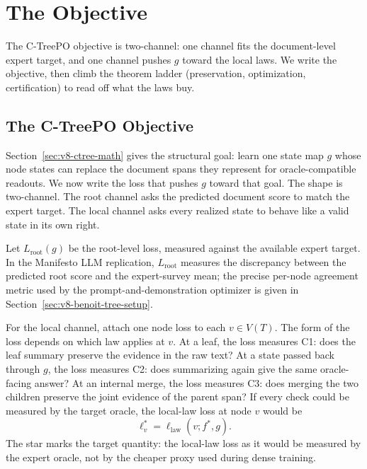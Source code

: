 \section{The Objective}
\label{sec:v8-objective}
\label{sec:v8-theorem-ladder}

The C-TreePO objective is two-channel: one channel fits the
document-level expert target, and one channel pushes \(g\) toward
the local laws. We write the objective, then climb the theorem
ladder (preservation, optimization, certification) to read off what
the laws buy.

\subsection{The C-TreePO Objective}

Section~\ref{sec:v8-ctree-math} gives the structural goal: learn
one state map \(g\) whose node states can replace the document
spans they represent for oracle-compatible readouts. We now write
the loss that pushes \(g\) toward that goal. The shape is
two-channel. The root channel asks the predicted document score to
match the expert target. The local channel asks every realized state
to behave like a valid state in its own right.

Let \(L_{\mathrm{root}}(g)\) be the root-level loss, measured
against the available expert target. In the Manifesto LLM
replication, \(L_{\mathrm{root}}\) measures the discrepancy between
the predicted root score and the expert-survey mean; the precise
per-node agreement metric used by the prompt-and-demonstration
optimizer is given in Section~\ref{sec:v8-benoit-tree-setup}.

For the local channel, attach one node loss to each \(v\in V(T)\).
The form of the loss depends on which law applies at \(v\). At a
leaf, the loss measures C1: does the leaf summary preserve the
evidence in the raw text? At a state passed back through \(g\), the
loss measures C2: does summarizing again give the same oracle-facing
answer? At an internal merge, the loss measures C3: does merging
the two children preserve the joint evidence of the parent span?
If every check could be measured by the target oracle, the local-law
loss at node \(v\) would be
\[
  \ell_v^\ast
  =
  \ell_{\mathrm{law}}(v;f^\ast,g).
\]
The star marks the target quantity: the local-law loss as it would be
measured by the expert oracle, not by the cheaper proxy used during
dense training.

